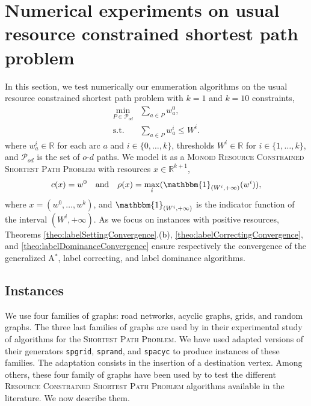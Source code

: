 \documentclass[11pt]{amsart}
\theoremstyle{plain}
\theoremstyle{remark}
\def\R{\mathbb{R}}
\newcommand{\ind}{\mathbbm{1}}
\newcommand{\SP}{\textsc{Shortest Path Problem}\xspace}
\newcommand{\RCSP}{\textsc{Resource Constrained Shortest Path Problem}\xspace}
\newcommand{\MRCSP}{\textsc{Monoid Resource Constrained Shortest Path Problem}\xspace}
\newcommand{\rcost}{c}
\newcommand{\rmeas}{\rho}
\newcommand{\re}{x}
\begin{document}
\section{Numerical experiments on usual resource constrained shortest path problem} \label{sec:numerical_experiments_on_usual_resource_constrained_shortest_path_problem}
In this section, we test numerically our enumeration algorithms on the usual resource constrained shortest path problem with $k = 1$ and $k=10$ constraints, 
\begin{equation}\label{eq:RCSPnumericalResultsPb}
	\begin{array}{rl}
	\displaystyle\min_{P\in \mathcal{P}_{od}} & \displaystyle\sum_{a \in P}w_{a}^{0}, \\
	\text{s.t.}& \displaystyle\sum_{a \in P} w_{a}^{i} \leq W^{i}.
	\end{array}
\end{equation}
where $w_{a}^{i} \in \R$ for each arc $a$ and $i \in \{0,\ldots,k\}$, thresholds $W^{i}\in \R$ for $i \in \{1,\ldots,k\}$, and $\mathcal{P}_{od}$ is the set of $o$-$d$ paths. We model it as a \MRCSP with resources $\re \in \R^{k+1}$, 
$$\rcost(\re)= w^{0}\quad \text{and} \quad \rmeas(\re) = \max_{i}(\ind_{(W^{i},+\infty)}(w^{i})), $$
where $\re = (w^{0},\ldots,w^{k})$, and $\ind_{(W^{i},+\infty)}$ is the indicator function of the interval $(W^{i},+\infty)$. As we focus on instances with positive resources, Theorems \ref{theo:labelSettingConvergence}.(b), \ref{theo:labelCorrectingConvergence}, and \ref{theo:labelDominanceConvergence} ensure respectively the convergence of the generalized A$^{*}$, label correcting, and label dominance algorithms.




\subsection{Instances} \label{sub:instances}
We use four families of graphs: road networks, acyclic graphs, grids, and random graphs. The three last families of graphs are used by \citet{cherkassky1996shortest} in their experimental study of algorithms for the \SP. We have used adapted versions of their generators \texttt{spgrid}, \texttt{sprand}, and \texttt{spacyc} to produce instances of these families. The adaptation consists in the insertion of a destination vertex. Among others, these four family of graphs have been used by \citet{dumitrescu2003improved} to test the different \RCSP algorithms available in the literature. We now describe them.
\end{document}

